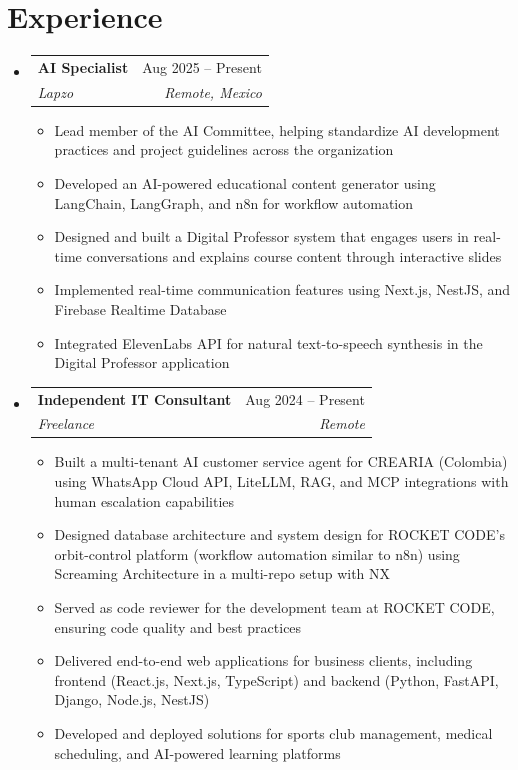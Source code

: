 \documentclass[letterpaper,11pt]{article}
\makeatletter
\newcommand{\resumeSubheading}[4]{
  \vspace{-2pt}
  \item[]
  \begin{tabular*}{\textwidth}{@{\extracolsep{\fill}}l r}
    \textbf{#1} & #2 \\
    \textit{#3} & \textit{#4} \\
  \end{tabular*}
  \vspace{-5pt}
}
\makeatother
\begin{document}
\section{Experience}
\begin{itemize}[leftmargin=0pt, itemindent=0pt, label={}, itemsep=1pt]
\resumeSubheading
{AI Specialist}{Aug 2025 -- Present}
{Lapzo}{Remote, Mexico}
\begin{itemize}[leftmargin=*, itemsep=0pt]
    \item Lead member of the AI Committee, helping standardize AI development practices and project guidelines across the organization
    \item Developed an AI-powered educational content generator using LangChain, LangGraph, and n8n for workflow automation
    \item Designed and built a Digital Professor system that engages users in real-time conversations and explains course content through interactive slides
    \item Implemented real-time communication features using Next.js, NestJS, and Firebase Realtime Database
    \item Integrated ElevenLabs API for natural text-to-speech synthesis in the Digital Professor application
\end{itemize}

\resumeSubheading
{Independent IT Consultant}{Aug 2024 -- Present}
{Freelance}{Remote}
\begin{itemize}[leftmargin=*, itemsep=0pt]
    \item Built a multi-tenant AI customer service agent for CREARIA (Colombia) using WhatsApp Cloud API, LiteLLM, RAG, and MCP integrations with human escalation capabilities
    \item Designed database architecture and system design for ROCKET CODE's orbit-control platform (workflow automation similar to n8n) using Screaming Architecture in a multi-repo setup with NX
    \item Served as code reviewer for the development team at ROCKET CODE, ensuring code quality and best practices
    \item Delivered end-to-end web applications for business clients, including frontend (React.js, Next.js, TypeScript) and backend (Python, FastAPI, Django, Node.js, NestJS)
    \item Developed and deployed solutions for sports club management, medical scheduling, and AI-powered learning platforms
\end{itemize}


\end{itemize}
\end{document}
